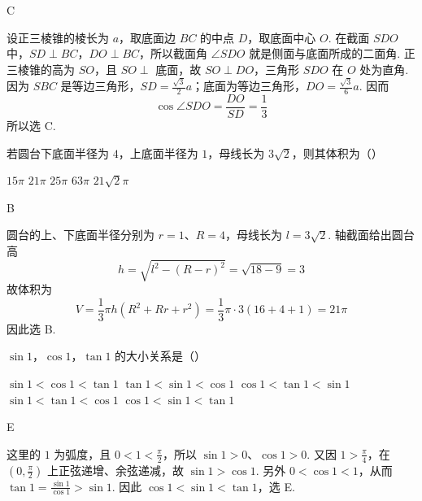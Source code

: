 \begin{answer}
C
\end{answer}

\begin{solution}
设正三棱锥的棱长为 \(a\)，取底面边 \(BC\) 的中点 \(D\)，取底面中心 \(O\). 在截面 \(SDO\) 中，\(SD\perp BC\)，\(DO\perp BC\)，所以截面角 \(\angle SDO\) 就是侧面与底面所成的二面角. 正三棱锥的高为 \(SO\)，且 \(SO\perp\) 底面，故 \(SO\perp DO\)，三角形 \(SDO\) 在 \(O\) 处为直角. 因为 \(SBC\) 是等边三角形，\(SD=\frac{\sqrt{3}}{2}a\)；底面为等边三角形，\(DO=\frac{\sqrt{3}}{6}a\). 因而
\[
\cos\angle SDO=\frac{DO}{SD}=\frac{1}{3}
\]
所以选 C.
\end{solution}


\begin{problem}

若圆台下底面半径为 \(4\)，上底面半径为 \(1\)，母线长为 \(3\sqrt{2}\)，则其体积为（\quad）

\choicesfive
    {\(15\pi\)}
    {\(21\pi\)}
    {\(25\pi\)}
    {\(63\pi\)}
    {\(21\sqrt{2}\pi\)}
\end{problem}

\begin{answer}
B
\end{answer}

\begin{solution}
圆台的上、下底面半径分别为 \(r=1\)、\(R=4\)，母线长为 \(l=3\sqrt{2}\). 轴截面给出圆台高
\[
h=\sqrt{l^2-(R-r)^2}=\sqrt{18-9}=3
\]
故体积为
\[
V=\frac{1}{3}\pi h(R^2+Rr+r^2)=\frac{1}{3}\pi\cdot3(16+4+1)=21\pi
\]
因此选 B.
\end{solution}


\begin{problem}

\(\sin 1\)，\(\cos 1\)，\(\tan 1\) 的大小关系是（\quad）

\choicesfive
    {\(\sin1<\cos1<\tan1\)}
    {\(\tan1<\sin1<\cos1\)}
    {\(\cos1<\tan1<\sin1\)}
    {\(\sin1<\tan1<\cos1\)}
    {\(\cos1<\sin1<\tan1\)}
\end{problem}

\begin{answer}
E
\end{answer}

\begin{solution}
这里的 \(1\) 为弧度，且 \(0<1<\frac{\pi}{2}\)，所以 \(\sin1>0\)、\(\cos1>0\). 又因 \(1>\frac{\pi}{4}\)，在 \((0,\frac{\pi}{2})\) 上正弦递增、余弦递减，故 \(\sin1>\cos1\). 另外 \(0<\cos1<1\)，从而 \(\tan1=\frac{\sin1}{\cos1}>\sin1\). 因此 \(\cos1<\sin1<\tan1\)，选 E.
\end{solution}


